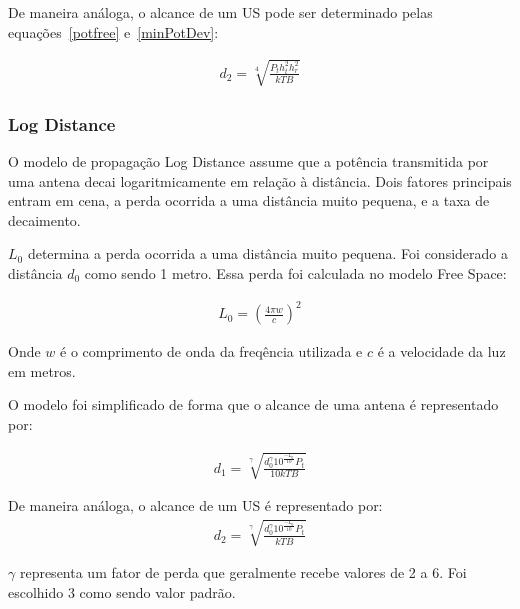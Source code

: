De maneira análoga, o alcance de um US pode ser determinado pelas equações~\ref{potfree} e~\ref{minPotDev}:

\begin{align}
  \label{dTwoRayDev} d_2 = \sqrt[4]{\frac{P_th_t^{2}h_r^{2}}{kTB}}
\end{align}


\subsubsection{Log Distance}

O modelo de propagação Log Distance assume que a potência transmitida por uma antena decai logaritmicamente em relação à distância. Dois fatores principais entram em cena, a perda ocorrida a uma distância muito pequena, e a taxa de decaimento.

\begin{math}L_0\end{math} determina a perda ocorrida a uma distância muito pequena. Foi considerado a distância \begin{math}d_0\end{math} como sendo 1 metro. Essa perda foi calculada no modelo Free Space:

\begin{align}
  \label{L0} L_0 = \left( \frac{4\pi w}{c}\right)^{2}
\end{align}

Onde \begin{math}w\end{math} é o comprimento de onda da freqência utilizada e \begin{math}c\end{math} é a velocidade da luz em metros.

O modelo foi simplificado de forma que o alcance de uma antena é representado por:

\begin{align}
  \label{dLogDistAnt} d_1 = \sqrt[\gamma]{\frac{d_0^{\gamma}10^{\frac{-L_0}{10}}  P_t}{10kTB}}
\end{align}

De maneira análoga, o alcance de um US é representado por:
\begin{align}
  \label{dLogDistDev} d_2 = \sqrt[\gamma]{\frac{d_0^{\gamma}10^{\frac{-L_0}{10}}  P_t}{kTB}}
\end{align}

\begin{math}\gamma \end{math} representa um fator de perda que geralmente recebe valores de 2 a 6. Foi escolhido 3 como sendo valor padrão.

